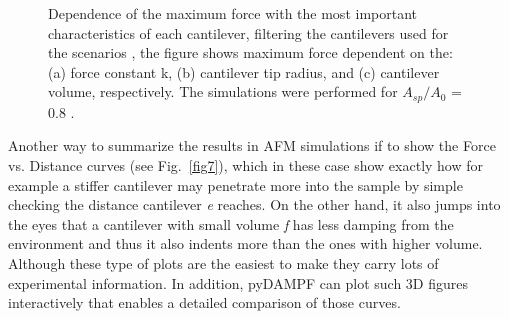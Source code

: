 \documentclass[letterpaper,compsoc,twoside]{IEEEtran}
\begin{document}
\begin{figure}[H]
\centering
\caption{Dependence of the maximum force with the most important characteristics of each cantilever, filtering the cantilevers used for the scenarios , the figure shows maximum force dependent on the: (a)  force constant k, (b)  cantilever tip radius, and (c) cantilever volume, respectively. The simulations were performed for $A_{sp}/A_{0}$ = 0.8 .} \label{fig5}
\end{figure}

Another way to summarize the results in AFM simulations if to show the Force vs. Distance curves (see Fig.~\ref{fig7}), which in these case show exactly how for example a stiffer cantilever may penetrate more into the sample by simple checking the distance cantilever \textit{e} reaches. On the other hand, it also jumps into the eyes that a cantilever with small volume \textit{f} has less damping from the environment and thus it also indents more than the ones with higher volume. Although these type of plots are the easiest to make they carry lots of experimental information. In addition, pyDAMPF can plot such 3D figures interactively that enables a detailed comparison of those curves.
\end{document}
